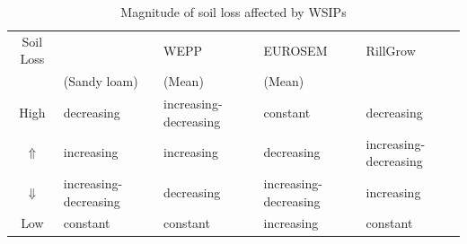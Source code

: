 \begin{table}[htbp]
  \centering
  \scriptsize
  \caption{Magnitude of soil loss affected by WSIPs}
  \label{tab:MagnitudeofSoilLossAffectedByIntraStormPatterns}
    \begin{tabular}{cllll}
      \toprule
      Soil Loss & \citet{parsons2006-68}  & WEPP & EUROSEM &
RillGrow \\
                & (Sandy loam) & (Mean) & (Mean) & \\
      \midrule
      High & decreasing & increasing-decreasing & constant &
decreasing\\
      $\Uparrow$ & increasing & increasing & decreasing &
increasing-decreasing\\
      $\Downarrow$ & increasing-decreasing & decreasing &
increasing-decreasing & increasing\\
      Low & constant & constant & increasing & constant\\
      \bottomrule
    \end{tabular}
\end{table}



